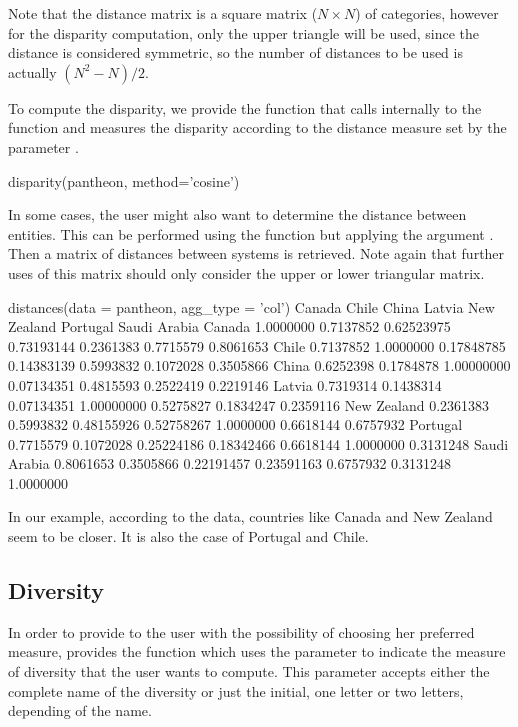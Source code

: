 Note that the distance matrix is a square matrix ($N \times N$) of categories, however for the disparity computation, only the upper triangle will be used, since the distance is considered symmetric, so the number of distances to be used is actually $\left(N^2 - N\right)/2$.
 
To compute the disparity, we provide the function  that calls internally to the function  and measures the disparity according to the distance measure set by the parameter .

\begin{example}
   disparity(pantheon, method='cosine')
\end{example}


In some cases, the user might also want to determine the distance between entities. This can be performed using the function  but applying the argument . Then a matrix of distances between systems is retrieved. Note again that further uses of this matrix should only consider the upper or lower triangular matrix.

\begin{example}
  distances(data = pantheon, agg_type = 'col')
                Canada     Chile      China     Latvia New Zealand  Portugal Saudi Arabia
Canada       1.0000000 0.7137852 0.62523975 0.73193144   0.2361383 0.7715579    0.8061653
Chile        0.7137852 1.0000000 0.17848785 0.14383139   0.5993832 0.1072028    0.3505866
China        0.6252398 0.1784878 1.00000000 0.07134351   0.4815593 0.2522419    0.2219146
Latvia       0.7319314 0.1438314 0.07134351 1.00000000   0.5275827 0.1834247    0.2359116
New Zealand  0.2361383 0.5993832 0.48155926 0.52758267   1.0000000 0.6618144    0.6757932
Portugal     0.7715579 0.1072028 0.25224186 0.18342466   0.6618144 1.0000000    0.3131248
Saudi Arabia 0.8061653 0.3505866 0.22191457 0.23591163   0.6757932 0.3131248    1.0000000
\end{example}

In our example, according to the data, countries like Canada and New Zealand seem to be closer. It is also the case of  Portugal and Chile.

\subsection{Diversity}\label{sec:diversity}
In order to provide to the user with the possibility of choosing her preferred measure,  provides the function  which uses the parameter  to indicate the measure of diversity that the user wants to compute. This parameter accepts either the complete name of the diversity or just the initial, one letter or two letters, depending of the name. 


